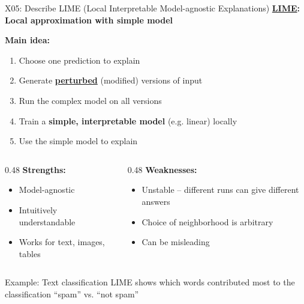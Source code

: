 \documentclass[aspectratio=169, 10pt]{beamer}
\begin{document}
\begin{frame}{X05: Describe LIME (Local Interpretable Model-agnostic Explanations)}
    \textbf{\href{https://github.com/marcotcr/lime}{LIME}: Local approximation with simple model}
    
    \vspace{0.2cm}
    \textbf{Main idea:}
    \begin{enumerate}
        \item Choose one prediction to explain
        \item Generate \textbf{\href{https://en.wikipedia.org/wiki/Perturbation_theory}{perturbed}} (modified) versions of input
        \item Run the complex model on all versions
        \item Train a \textbf{simple, interpretable model} (e.g. linear) locally
        \item Use the simple model to explain
    \end{enumerate}
    
    \vspace{0.2cm}
    \begin{columns}[T]
        \begin{column}{0.48\textwidth}
            \textbf{Strengths:}
            \begin{itemize}
                \item Model-agnostic
                \item Intuitively understandable
                \item Works for text, images, tables
            \end{itemize}
        \end{column}
        \begin{column}{0.48\textwidth}
            \textbf{Weaknesses:}
            \begin{itemize}
                \item Unstable -- different runs can give different answers
                \item Choice of neighborhood is arbitrary
                \item Can be misleading
            \end{itemize}
        \end{column}
    \end{columns}
    
    {\footnotesize
    \begin{block}{Example: Text classification}
        LIME shows which words contributed most to the classification ``spam'' vs. ``not spam''
    \end{block}
    }
\end{frame}
\end{document}
